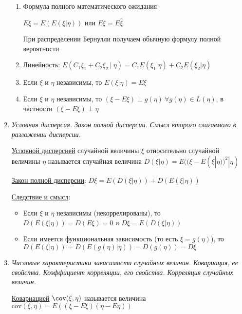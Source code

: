 \begin{enumerate}
\begin{enumerate}
        \item Формула полного математического ожидания

        $E\xi = E(E(\xi|\eta))$ или $E\xi = E\hat{\xi}$

        \Nota При распределении Бернулли получаем обычную формулу полной вероятности

        \item Линейность: $E(C_1\xi_1 + C_2\xi_2 \ | \ \eta) = C_1 E(\xi_1|\eta) + C_2 E(\xi_2|\eta)$

        \item Если $\xi$ и $\eta$ независимы, то $E(\xi|\eta) = E\xi$

        \item Если $\xi$ и $\eta$ независимы, то $(\xi - E\xi) \perp g(\eta) \ \forall g(\eta) \in L(\eta)$, 
        в частности $(\xi - E\xi) \perp \eta$
    \end{enumerate}

    \item \textit{Условная дисперсия. Закон полной дисперсии. Смысл второго слагаемого в разложении дисперсии.}

    \hyperlink{conditionalvariance}{Условной дисперсией} случайной величины $\xi$ относительно случайной величины $\eta$ называется случайная величина 
    $D(\xi | \eta) = E((\xi - E(\xi | \eta))^2 | \eta)$
    
    \hyperlink{lawoffullvariance}{Закон полной дисперсии}: \Ths $D\xi = E(D(\xi | \eta)) + D(E(\xi | \eta))$

    \underline{Следствие и смысл}: 
    
    \begin{itemize}
        \item Если $\xi$ и $\eta$ независимы (некоррелированы), то $D(E(\xi | \eta)) = D(E\xi) = 0$ и $D\xi = E(D(\xi | \eta))$

        \item Если имеется функциональная зависимость (то есть $\xi = g(\eta)$), то $D(E(\xi | \eta)) = D(E(g(\eta) | \eta)) = 
        D(g(\eta)) = D\xi$
    \end{itemize}

    \item \textit{Числовые характеристики зависимости случайных величин. Ковариация, ее свойства. Коэффициент корреляции, его свойства. Корреляция случайных величин.}

    \hyperlink{covariance}{Ковариацией} $\mathrm{\cov}(\xi, \eta)$ называется величина $\mathrm{cov}(\xi, \eta) = E((\xi - E\xi)(\eta - E\eta))$


\end{enumerate}
